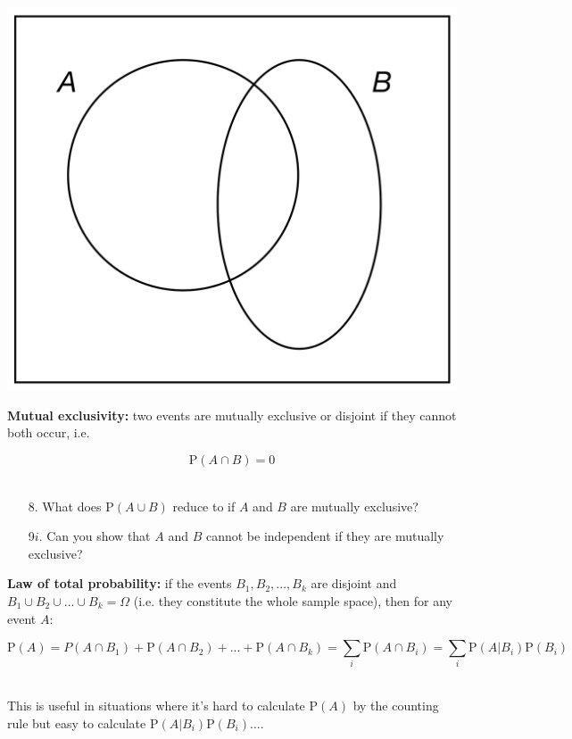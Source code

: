 \documentclass[10pt]{extarticle}
\renewcommand{\P}{\text{P}}
\begin{document}
\begin{itemize}
\begin{center}
        \includegraphics[scale=0.23]{ps2-pic2.png}
\end{center}

\end{itemize}

{\bf Mutual exclusivity:} two events are mutually exclusive or disjoint if they cannot both occur, i.e. 

$$\P(A \cap B) = 0$$ \ 

\begin{itemize}

	\item[8.] What does $\P(A \cup B)$ reduce to if $A$ and $B$ are mutually exclusive? \\ 

	\item[9$i$.] Can you show that $A$ and $B$ cannot be independent if they are mutually exclusive? 
	
\end{itemize}

\hfill 

{\bf Law of total probability:} if the events $B_1, B_2, ..., B_k$ are disjoint and $B_1 \cup B_2 \cup ... \cup B_k = \Omega$ (i.e. they constitute the whole sample space), then for any event $A$:

$$\P(A) = P(A \cap B_1) + \P(A \cap B_2) + ... + \P(A \cap B_k) = \sum_i \P(A \cap B_i) = \sum_i \P(A|B_i)\P(B_i)$$ \ 

This is useful in situations where it's hard to calculate $\P(A)$ by the counting rule but easy to calculate $\P(A|B_i) \P(B_i) ...$.  
\end{document}
